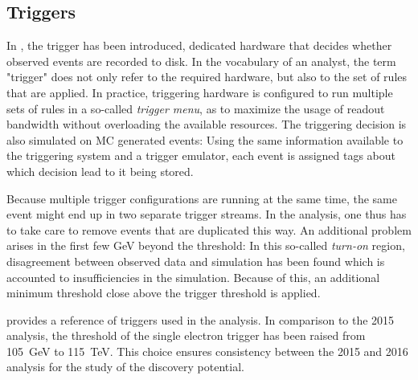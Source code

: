\subsection{Triggers}
\newcommand{\trigger}[1]{\texttt{\detokenize{#1}}}
In , the trigger has been introduced, dedicated hardware that decides whether observed events are recorded to disk. In the vocabulary of an analyst, the term "trigger" does not only refer to the required hardware, but also to the set of rules that are applied. In practice, triggering hardware is configured to run multiple sets of rules in a so-called \emph{trigger menu}, as to maximize the usage of readout bandwidth without overloading the available resources.
The triggering decision is also simulated on \ac{MC} generated events: Using the same information available to the triggering system and a trigger emulator, each event is assigned tags about which decision lead to it being stored. 

Because multiple trigger configurations are running at the same time, the same event might end up in two separate trigger streams. In the analysis, one thus has to take care to remove events that are duplicated this way.
An additional problem arises in the first few \si{\GeV} beyond the \pT threshold: In this so-called \emph{turn-on} region, disagreement between observed data and simulation has been found which is accounted to insufficiencies in the simulation. Because of this, an additional minimum \pT threshold close above the trigger threshold is applied.

 provides a reference of triggers used in the analysis. In comparison to the 2015 analysis, the \pT threshold of the single electron trigger has been raised from \SI{105}{\GeV} to \SI{115}{\TeV}. This choice ensures consistency between the 2015 and 2016 analysis for the study of the discovery potential.

